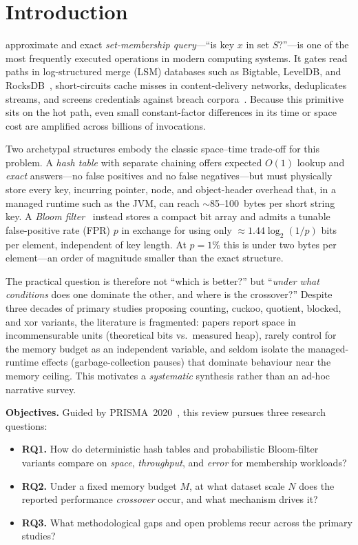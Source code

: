 \documentclass[conference]{IEEEtran}
\begin{document}
\section{Introduction}
 approximate and exact \emph{set-membership query}---``is
key $x$ in set $S$?''---is one of the most frequently executed operations in
modern computing systems. It gates read paths in log-structured merge (LSM)
databases such as Bigtable, LevelDB, and RocksDB~\cite{chang2008bigtable},
short-circuits cache misses in content-delivery networks, deduplicates streams,
and screens credentials against breach corpora~\cite{tarkoma2012bloom}. Because
this primitive sits on the hot path, even small constant-factor differences in
its time or space cost are amplified across billions of invocations.

Two archetypal structures embody the classic space--time trade-off for this
problem. A \emph{hash table} with separate chaining offers expected $O(1)$
lookup and \emph{exact} answers---no false positives and no false
negatives---but must physically store every key, incurring pointer, node, and
object-header overhead that, in a managed runtime such as the JVM, can reach
$\sim$85--100~bytes per short string key. A \emph{Bloom filter}~\cite{bloom1970}
instead stores a compact bit array and admits a tunable false-positive rate
(FPR) $p$ in exchange for using only $\approx 1.44\log_2(1/p)$ bits per element,
independent of key length. At $p=1\%$ this is under two bytes per element---an
order of magnitude smaller than the exact structure.

The practical question is therefore not ``which is better?'' but ``\emph{under
what conditions} does one dominate the other, and where is the crossover?''
Despite three decades of primary studies proposing counting, cuckoo, quotient,
blocked, and xor variants, the literature is fragmented: papers report space in
incommensurable units (theoretical bits vs.\ measured heap), rarely control for
the memory budget as an independent variable, and seldom isolate the
managed-runtime effects (garbage-collection pauses) that dominate behaviour near
the memory ceiling. This motivates a \emph{systematic} synthesis rather than an
ad-hoc narrative survey.

\noindent\textbf{Objectives.} Guided by PRISMA~2020~\cite{page2021prisma}, this
review pursues three research questions:
\begin{itemize}
  \item \textbf{RQ1.} How do deterministic hash tables and probabilistic
        Bloom-filter variants compare on \emph{space}, \emph{throughput}, and
        \emph{error} for membership workloads?
  \item \textbf{RQ2.} Under a fixed memory budget $M$, at what dataset scale
        $N$ does the reported performance \emph{crossover} occur, and what
        mechanism drives it?
  \item \textbf{RQ3.} What methodological gaps and open problems recur across
        the primary studies?
\end{itemize}
\end{document}
